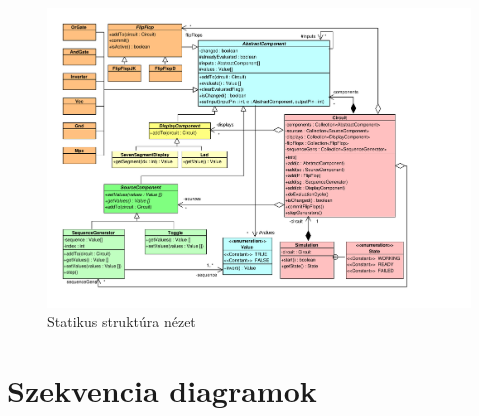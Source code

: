 \begin{figure}[H]
\begin{center}
\includegraphics*[angle=90, width=17cm, viewport = 30 30 740 565]{chapters/chapter04/classdiagram/class.pdf}
\caption{Statikus struktúra nézet}
\label{fig:class_diagram}
\end{center}
\end{figure}
%
%
%

\section{Szekvencia diagramok}

